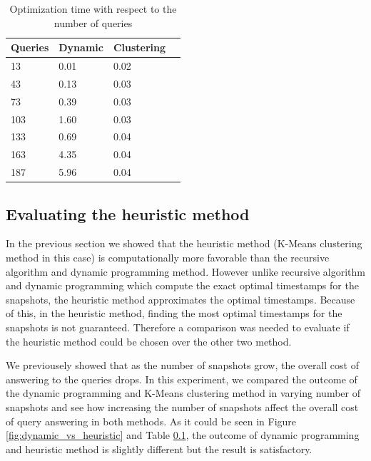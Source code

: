 \begin {center}
\begin{table}
	\centering
	\caption{Optimization time with respect to the number of queries}
	\label {table:variable_queries_2}
	\begin{tabular}{p{2cm}p{3cm}p{3cm}p{3cm}}
		\hline
		Queries  & Dynamic  & Clustering \\ \hline
		13 & 0.01  & 0.02  \\  
		43 & 0.13  & 0.03  \\
		73 & 0.39  & 0.03  \\
		103 & 1.60  & 0.03  \\
		133 & 0.69  & 0.04 \\
		163 & 4.35  & 0.04  \\
		187 & 5.96  & 0.04  \\\hline
	\end{tabular}
\end{table}
\end{center}

\subsection{Evaluating the heuristic method}
In the previous section we showed that the heuristic method (K-Means clustering method in this case) is computationally more favorable than the recursive algorithm and dynamic programming method. However unlike recursive algorithm and dynamic programming which compute the exact optimal timestamps for the snapshots, the heuristic method approximates the optimal timestamps. Because of this, in the heuristic method, finding the most optimal timestamps for the snapshots is not guaranteed. Therefore a comparison was needed to evaluate if the heuristic method could be chosen over the other two method.

We previousely showed that as the number of snapshots grow, the overall cost of answering to the queries drops. In this experiment, we compared the outcome of the dynamic programming and K-Means clustering method in varying number of snapshots and see how increasing the number of snapshots affect the overall cost of query answering in both methods. As it could be seen in Figure \ref{fig:dynamic_vs_heuristic} and Table \ref{}, the outcome of dynamic programming and heuristic method is slightly different but the result is satisfactory.

